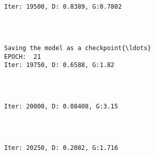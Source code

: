 \documentclass[11pt]{article}
\begin{document}
    \begin{center}
    \end{center}
    { \hspace*{\fill} \\}
    
    \begin{Verbatim}[commandchars=\\\{\}]

Iter: 19500, D: 0.8389, G:0.7802
    \end{Verbatim}

    \begin{center}
    \end{center}
    { \hspace*{\fill} \\}
    
    \begin{Verbatim}[commandchars=\\\{\}]

Saving the model as a checkpoint{\ldots}
EPOCH:  21
Iter: 19750, D: 0.6588, G:1.82
    \end{Verbatim}

    \begin{center}
    \end{center}
    { \hspace*{\fill} \\}
    
    \begin{Verbatim}[commandchars=\\\{\}]

Iter: 20000, D: 0.08408, G:3.15
    \end{Verbatim}

    \begin{center}
    \end{center}
    { \hspace*{\fill} \\}
    
    \begin{Verbatim}[commandchars=\\\{\}]

Iter: 20250, D: 0.2082, G:1.716
    \end{Verbatim}
\end{document}
